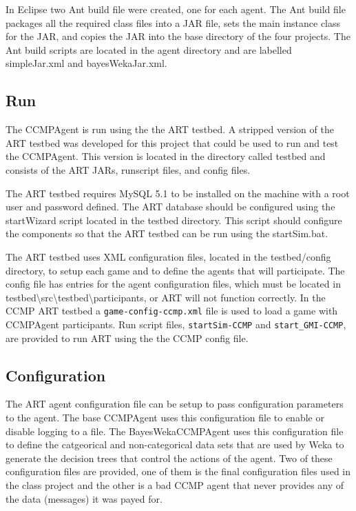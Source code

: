 In Eclipse two Ant build file were created, one for each agent.  The Ant build
file packages all the required class files into a JAR file, sets the main
instance class for the JAR, and copies the JAR into the base directory of the
four projects.  The Ant build scripts are located in the agent directory and
are labelled simpleJar.xml and bayesWekaJar.xml.

\subsection{Run}
The CCMPAgent is run using the the ART testbed.  A stripped version of the
ART testbed was developed for this project that could be used to run and test
the CCMPAgent.  This version is located in the directory called testbed and
consists of the ART JARs, runscript files, and config files.  

The ART testbed requires MySQL 5.1 to be installed on the machine with a root
user and password defined.  The ART database should be configured using the
startWizard script located in the testbed directory.  This script should
configure the components so that the ART testbed can be run using the
startSim.bat.

The ART testbed uses XML configuration files, located in the testbed/config
directory, to setup each game and to define the agents that will participate. The
config file has entries for the agent configuration files, which must be located
in testbed\textbackslash src\textbackslash testbed\textbackslash participants, or
ART will not function correctly.  In the CCMP ART testbed a
\verb+game-config-ccmp.xml+ file is used to load a game with CCMPAgent
participants.  Run script files, \verb+startSim-CCMP+ and \verb+start_GMI-CCMP+,
are provided to run ART using the the CCMP config file.

\subsection{Configuration}
The ART agent configuration file can be setup to pass configuration parameters
to the agent.  The base CCMPAgent uses this configuration file to enable or
disable logging to a file.  The BayesWekaCCMPAgent uses this configuration file
to define the catgeorical and non-categorical data sets that are used by Weka
to generate the decision trees that control the actions of the agent.  Two of
these configuration files are provided, one of them is the final configuration
files used in the class project and the other is a bad CCMP agent that never
provides any of the data (messages) it was payed for.

